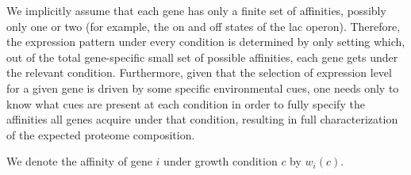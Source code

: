 We implicitly assume that each gene has only a finite set of affinities, possibly only one or two (for example, the on and off states of the lac operon).
Therefore, the expression pattern under every condition is determined by only setting which, out of the total gene-specific small set of possible affinities, each gene gets under the relevant condition.
Furthermore, given that the selection of expression level for a given gene is driven by some specific environmental cues, one needs only to know what cues are present at each condition in order to fully specify the affinities all genes acquire under that condition, resulting in full characterization of the expected proteome composition.

We denote the affinity of gene $i$ under growth condition $c$ by $w_i(c)$.